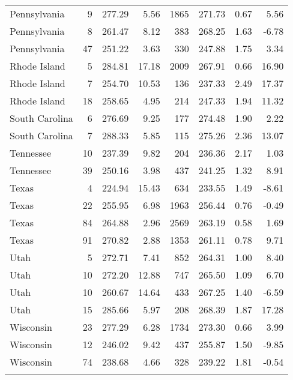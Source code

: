 \begin{longtable}{lrrr@{\extracolsep{10pt}}rrrr}
  Pennsylvania &   9 & 277.29 & 5.56 & 1865 & 271.73 & 0.67 & 5.56 \\ 
  Pennsylvania &   8 & 261.47 & 8.12 & 383 & 268.25 & 1.63 & -6.78 \\ 
  Pennsylvania &  47 & 251.22 & 3.63 & 330 & 247.88 & 1.75 & 3.34 \\ 
  Rhode Island &   5 & 284.81 & 17.18 & 2009 & 267.91 & 0.66 & 16.90 \\ 
  Rhode Island &   7 & 254.70 & 10.53 & 136 & 237.33 & 2.49 & 17.37 \\ 
  Rhode Island &  18 & 258.65 & 4.95 & 214 & 247.33 & 1.94 & 11.32 \\ 
  South Carolina &   6 & 276.69 & 9.25 & 177 & 274.48 & 1.90 & 2.22 \\ 
  South Carolina &   7 & 288.33 & 5.85 & 115 & 275.26 & 2.36 & 13.07 \\ 
  Tennessee &  10 & 237.39 & 9.82 & 204 & 236.36 & 2.17 & 1.03 \\ 
  Tennessee &  39 & 250.16 & 3.98 & 437 & 241.25 & 1.32 & 8.91 \\ 
  Texas &   4 & 224.94 & 15.43 & 634 & 233.55 & 1.49 & -8.61 \\ 
  Texas &  22 & 255.95 & 6.98 & 1963 & 256.44 & 0.76 & -0.49 \\ 
  Texas &  84 & 264.88 & 2.96 & 2569 & 263.19 & 0.58 & 1.69 \\ 
  Texas &  91 & 270.82 & 2.88 & 1353 & 261.11 & 0.78 & 9.71 \\ 
  Utah &   5 & 272.71 & 7.41 & 852 & 264.31 & 1.00 & 8.40 \\ 
  Utah &  10 & 272.20 & 12.88 & 747 & 265.50 & 1.09 & 6.70 \\ 
  Utah &  10 & 260.67 & 14.64 & 433 & 267.25 & 1.40 & -6.59 \\ 
  Utah &  15 & 285.66 & 5.97 & 208 & 268.39 & 1.87 & 17.28 \\ 
  Wisconsin &  23 & 277.29 & 6.28 & 1734 & 273.30 & 0.66 & 3.99 \\ 
  Wisconsin &  12 & 246.02 & 9.42 & 437 & 255.87 & 1.50 & -9.85 \\ 
  Wisconsin &  74 & 238.68 & 4.66 & 328 & 239.22 & 1.81 & -0.54 \\ 
   \hline
\hline
\label{g8readinglraiclevel1}
\end{longtable}
